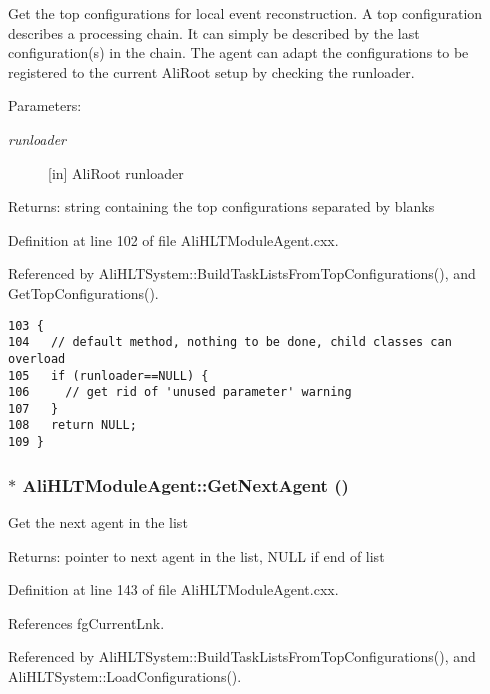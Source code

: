Get the top configurations for local event reconstruction. A top configuration describes a processing chain. It can simply be described by the last configuration(s) in the chain. The agent can adapt the configurations to be registered to the current Ali\-Root setup by checking the runloader. \begin{Desc}
\item[Parameters:]
\begin{description}
\item[{\em runloader}][in] Ali\-Root runloader \end{description}
\end{Desc}
\begin{Desc}
\item[Returns:]string containing the top configurations separated by blanks \end{Desc}


Definition at line 102 of file Ali\-HLTModule\-Agent.cxx.

Referenced by Ali\-HLTSystem::Build\-Task\-Lists\-From\-Top\-Configurations(), and Get\-Top\-Configurations().

\footnotesize\begin{verbatim}103 {
104   // default method, nothing to be done, child classes can overload
105   if (runloader==NULL) {
106     // get rid of 'unused parameter' warning
107   }
108   return NULL;
109 }
\end{verbatim}\normalsize 


\subsubsection{ $\ast$ Ali\-HLTModule\-Agent::Get\-Next\-Agent ()\hspace{0.3cm}{\tt  [static]}}\label{classAliHLTModuleAgent_e2}


Get the next agent in the list \begin{Desc}
\item[Returns:]pointer to next agent in the list, NULL if end of list \end{Desc}


Definition at line 143 of file Ali\-HLTModule\-Agent.cxx.

References fg\-Current\-Lnk.

Referenced by Ali\-HLTSystem::Build\-Task\-Lists\-From\-Top\-Configurations(), and Ali\-HLTSystem::Load\-Configurations().

